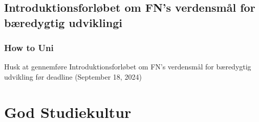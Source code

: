 \documentclass[t, aspectratio=169]{beamer}
\begin{document}
\subsection{Introduktionsforløbet om FN's verdensmål for bæredygtig udviklingi}
\begin{frame}[fragile]
  \frametitle{How to Uni}
  \vspace{30mm}
  \begin{center}
    Husk at gennemføre Introduktionsforløbet om FN's verdensmål for bæredygtig udvikling før deadline (September 18, 2024)
  \end{center}
\end{frame}

\section{God Studiekultur}
\end{document}
